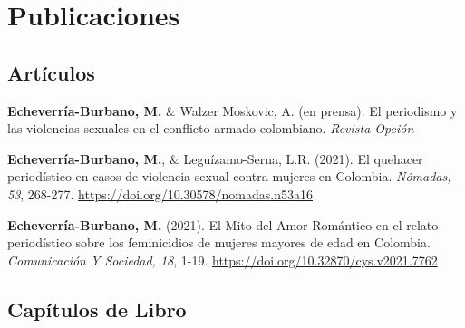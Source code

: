 \documentclass[11pt,a4paper,]{awesome-cv}
\begin{document}
\begin{cventries}
    \vspace{-4.0mm}
    \vspace{-4.0mm}
    \vspace{-4.0mm}
\end{cventries}

\hypertarget{publicaciones}{%
\section{Publicaciones}\label{publicaciones}}

\hypertarget{section}{%
\subsection{\texorpdfstring{\textbf{Artículos}}{}}\label{section}}

\begingroup
\setlength{\parindent}{-0.5in}
\setlength{\leftskip}{0.5in}

\textbf{Echeverría-Burbano, M.} \& Walzer Moskovic, A. (en prensa). El
periodismo y las violencias sexuales en el conflicto armado colombiano.
\emph{Revista Opción}

\textbf{Echeverría-Burbano, M.}, \& Leguízamo-Serna, L.R. (2021). El
quehacer periodístico en casos de violencia sexual contra mujeres en
Colombia. \emph{Nómadas, 53}, 268-277.
\url{https://doi.org/10.30578/nomadas.n53a16}

\textbf{Echeverría-Burbano, M.} (2021). El Mito del Amor Romántico en el
relato periodístico sobre los feminicidios de mujeres mayores de edad en
Colombia. \emph{Comunicación Y Sociedad, 18}, 1-19.
\url{https://doi.org/10.32870/cys.v2021.7762}

\endgroup

\hypertarget{section-1}{%
\subsection{\texorpdfstring{\textbf{Capítulos de Libro}}{}}\label{section-1}}

\begingroup
\setlength{\parindent}{-0.5in}
\setlength{\leftskip}{0.5in}
\end{document}
